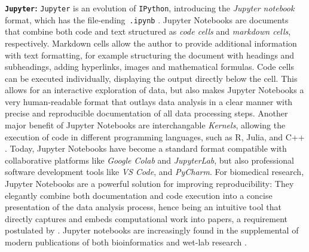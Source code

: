 \textbf{\texttt{Jupyter}:} \texttt{Jupyter} is an evolution of \texttt{IPython},
introducing the \emph{Jupyter notebook} format, which has the
file-ending~\texttt{.ipynb} \cite{kluyverJupyterNotebooksPublishing2016}.
Jupyter Notebooks are documents that combine both code and text structured as
\emph{code cells} and \emph{markdown cells}, respectively. Markdown cells allow
the author to provide additional information with text formatting, for example
structuring the document with headings and subheadings, adding hyperlinks,
images and mathematical formulas. Code cells can be executed individually,
displaying the output directly below the cell. This allows for an interactive
exploration of data, but also makes Jupyter Notebooks a very human-readable
format that outlays data analysis in a clear manner with precise and
reproducible documentation of all data processing steps. Another major benefit
of Jupyter Notebooks are interchangable \textit{Kernels}, allowing the execution
of code in different programming languages, such as R, Julia, and C++
\cite{giorgiLanguageEngineBioinformatics2022}. Today, Jupyter Notebooks have
become a standard format compatible with collaborative platforms like
\textit{Google Colab} and \textit{JupyterLab}, but also professional software
development tools like \textit{VS Code}, and \textit{PyCharm}. For biomedical
research, Jupyter Notebooks are a powerful solution for improving
reproducibility: They elegantly combine both documentation and code execution
into a concise presentation of the data analysis process, hence being an
intuitive tool that directly captures and embeds computational work into
papers, a requirement postulated by
\citet{mesirovAccessibleReproducibleResearch2010}. Jupyter notebooks are
increasingly found in the supplemental of modern publications of both
bioinformatics and wet-lab research
\cite{taskiranCelltypedirectedDesignSynthetic2024,
    bosch-queraltFluorescenceMicroscopybasedProtocol2022,
    howeChallengesOpportunitiesUnderstanding2015}.



